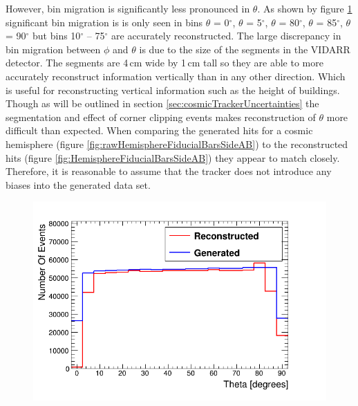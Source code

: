 However, bin migration is significantly less pronounced in $\theta$. As shown by figure \ref{fig:thetaGenVsRecoHem} significant bin migration is is only seen in bins $\theta$ = 0$^\circ$, $\theta$ = 5$^\circ$, $\theta$ = 80$^\circ$, $\theta$ = 85$^\circ$, $\theta$ = 90$^\circ$ but bins 10$^\circ$ -- 75$^\circ$ are accurately reconstructed. The large discrepancy in bin migration between $\phi$ and $\theta$ is due to the size of the segments in the VIDARR detector. The segments are 4\,cm wide by 1\,cm tall so they are able to more accurately reconstruct information vertically than in any other direction. Which is useful for reconstructing vertical information such as the height of buildings. Though as will be outlined in section \ref{sec:cosmicTrackerUncertainties} the segmentation and effect of corner clipping events makes reconstruction of $\theta$ more difficult than expected. When comparing the generated hits for a cosmic hemisphere (figure \ref{fig:rawHemisphereFiducialBarsSideAB}) to the reconstructed hits (figure \ref{fig:HemisphereFiducialBarsSideAB}) they appear to match closely. Therefore, it is reasonable to assume that the tracker does not introduce any biases into the generated data set.

\begin{figure}[!h]
 \centering
 \includegraphics[width=0.6\linewidth]{Chapter5/Figs/Raster/hemisphereThetaCompare.png}
 \label{fig:thetaGenVsRecoHem}
\end{figure}


